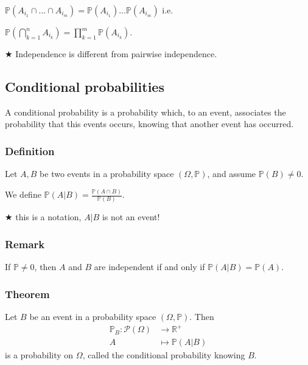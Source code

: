             $\mathbb{P}(A_{i_1} \cap ... \cap A_{i_m}) = \mathbb{P}(A_{i_1})...\mathbb{P}(A_{i_m})$ i.e. 

            \vspace{5pt}
            
            $\mathbb{P}(\bigcap_{k=1}^n A_{i_k}) = \prod_{k=1}^m \mathbb{P}(A_{i_k})$.

            \vspace{5pt}

            $\bigstar$ Independence is different from pairwise independence.

        \subsection{Conditional probabilities}
            A conditional probability is a probability which, to an event, associates the probability that this events occurs, knowing that another event has occurred.

            \subsubsection{Definition}
                Let $A,B$ be two events in a probability space $(\Omega, \mathbb{P})$, and assume $\mathbb{P}(B)\neq 0$.

                \vspace{5pt}

                \centerline{We define $\mathbb{P}(A | B)=\frac{\mathbb{P}(A\cap B)}{\mathbb{P}(B)}$.}

                \vspace{5pt}

                $\bigstar$ this is a notation, $A|B$ is not an event!

            \subsubsection{Remark}
                If $\mathbb{P} \neq 0$, then $A$ and $B$ are independent if and only if $\mathbb{P}(A|B) = \mathbb{P}(A)$.

            \subsubsection{Theorem}
                Let $B$ be an event in a probability space $(\Omega, \mathbb{P})$. Then 
                \begin{align*} 
                \mathbb{P}_B\colon \mathcal{P}(\Omega) & \rightarrow \mathbb{R}^+ \\[-1ex]
                A & \mapsto \mathbb{P}(A|B)
                \end{align*}
                is a probability on $\Omega$, called the conditional probability knowing $B$.

